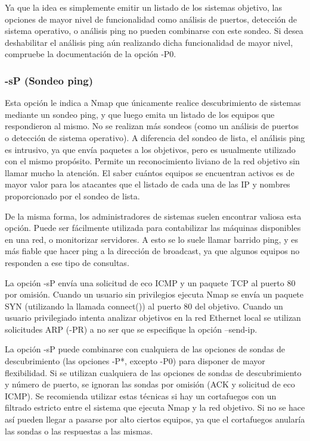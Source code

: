\documentclass[a4paper, 11pt, titlepage]{book}
\begin{document}
            Ya que la idea es simplemente emitir un listado de los sistemas objetivo, las opciones de 
            mayor nivel de funcionalidad como análisis de puertos, detección de sistema operativo, o 
            análisis ping no pueden combinarse con este sondeo. Si desea deshabilitar el análisis ping 
            aún realizando dicha funcionalidad de mayor nivel, compruebe la documentación de la opción -P0.

            \subsubsection{\textbf{-sP (Sondeo ping)}} Esta opción le indica a Nmap que únicamente realice 
            descubrimiento de sistemas mediante un sondeo ping, y que luego emita un listado de los equipos 
            que respondieron al mismo. No se realizan más sondeos (como un análisis de puertos o detección 
            de sistema operativo). A diferencia del sondeo de lista, el análisis ping es intrusivo, ya que 
            envía paquetes a los objetivos, pero es usualmente utilizado con el mismo propósito. Permite 
            un reconocimiento liviano de la red objetivo sin llamar mucho la atención. El saber cuántos 
            equipos se encuentran activos es de mayor valor para los atacantes que el listado de cada una 
            de las IP y nombres proporcionado por el sondeo de lista.

            De la misma forma, los administradores de sistemas suelen encontrar valiosa esta opción. 
            Puede ser fácilmente utilizada para contabilizar las máquinas disponibles en una red, o 
            monitorizar servidores. A esto se lo suele llamar barrido ping, y es más fiable que hacer 
            ping a la dirección de broadcast, ya que algunos equipos no responden a ese tipo de consultas.

            La opción -sP envía una solicitud de eco ICMP y un paquete TCP al puerto 80 por omisión. 
            Cuando un usuario sin privilegios ejecuta Nmap se envía un paquete SYN (utilizando la llamada 
            connect()) al puerto 80 del objetivo. Cuando un usuario privilegiado intenta analizar objetivos 
            en la red Ethernet local se utilizan solicitudes ARP (-PR) a no ser que se especifique la 
            opción --send-ip.

            La opción -sP puede combinarse con cualquiera de las opciones de sondas de descubrimiento 
            (las opciones -P*, excepto -P0) para disponer de mayor flexibilidad. Si se utilizan cualquiera 
            de las opciones de sondas de descubrimiento y número de puerto, se ignoran las sondas por omisión 
            (ACK y solicitud de eco ICMP). Se recomienda utilizar estas técnicas si hay un cortafuegos con un 
            filtrado estricto entre el sistema que ejecuta Nmap y la red objetivo. Si no se hace así pueden 
            llegar a pasarse por alto ciertos equipos, ya que el cortafuegos anularía las sondas o las 
            respuestas a las mismas.
\end{document}
